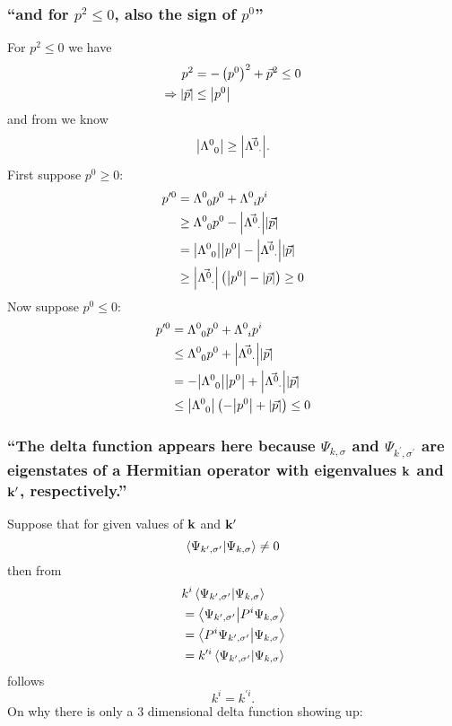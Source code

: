 \subsubsection{\enquote{and for $p^2\leq0$, also the sign of $p^0$} }
For $p^2\leq 0$ we have
\begin{align*} 
	p^2&=-\left(p^0\right)^2+\vec{p}^2\leq0\\
	\Rightarrow \abs{\vec{p}}&\leq \abs{p^0}
\end{align*}
and from  we know
\[\abs{\Lambda^0_{\hphantom{0}0}}\geq \abs{\vec{\Lambda^{0}_{\hphantom{0}\cdot}}}.\]
First suppose $p^0\geq0$:
\begin{align*} 
	p^{\prime 0}&=\Lambda^0_{\hphantom{0}0} p^0 +\Lambda^0_{\hphantom{0}i}p^i\\
	&\geq \Lambda^0_{\hphantom{0}0} p^0 - \abs{\vec{\Lambda^{0}_{\hphantom{0}\cdot}}} \abs{\vec{p}}\\
	&= \abs{\Lambda^0_{\hphantom{0}0}} \abs{p^0} - \abs{\vec{\Lambda^{0}_{\hphantom{0}\cdot}}} \abs{\vec{p}}\\
	&\geq \abs{\vec{\Lambda^{0}_{\hphantom{0}\cdot}}}\left( \abs{p^0}-\abs{\vec{p}}\right)\geq 0
\end{align*}
Now suppose $p^0\leq0$:
\begin{align*} 
	p^{\prime 0}&=\Lambda^0_{\hphantom{0}0} p^0 +\Lambda^0_{\hphantom{0}i}p^i\\
	&\leq \Lambda^0_{\hphantom{0}0} p^0 + \abs{\vec{\Lambda^{0}_{\hphantom{0}\cdot}}} \abs{\vec{p}}\\
	&= -\abs{\Lambda^0_{\hphantom{0}0}} \abs{p^0} + \abs{\vec{\Lambda^{0}_{\hphantom{0}\cdot}}} \abs{\vec{p}}\\
	&\leq \abs{\Lambda^0_{\hphantom{0}0}}\left( -\abs{p^0}+\abs{\vec{p}}\right)\leq 0
\end{align*}

\subsubsection{ \enquote{The delta function appears here because $\Psi_{k,\sigma}$ and $\Psi_{k^\prime,\sigma^\prime}$ are eigenstates of a Hermitian operator with eigenvalues $\mathbf{k}$ and $\mathbf{k}^\prime$, respectively.} }\label{sususec:2_5_p66_1}
Suppose that for given values of $\mathbf{k}$ and $\mathbf{k}^\prime$ \[\innerproduct{\Psi_{k^\prime,\sigma^\prime}}{\Psi_{k,\sigma}}\neq 0\]
then from
\begin{align*} 
	&k^i\innerproduct{\Psi_{k^\prime,\sigma^\prime}}{\Psi_{k,\sigma}}\\
	&=\innerproduct{\Psi_{k^\prime,\sigma^\prime}}{P^i\Psi_{k,\sigma}}\\
	&=\innerproduct{P^i\Psi_{k^\prime,\sigma^\prime}}{\Psi_{k,\sigma}}\\
	&=k^{\prime i}\innerproduct{\Psi_{k^\prime,\sigma^\prime}}{\Psi_{k,\sigma}}
\end{align*}
follows \[k^i=k^{\prime i}.\]
On why there is only a 3 dimensional delta function showing up:


